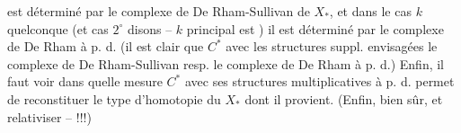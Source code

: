 est déterminé par le complexe de
De Rham-Sullivan de $X_*$, et dans
le cas $k$ quelconque (et cas $2^\circ$ disons
-- $k$ principal est ) il est
déterminé par le complexe de
De Rham à p. d. 
 (il est clair que $C^*$
avec les structures suppl. envisagées
 le complexe de De Rham-Sullivan resp. le complexe de
De Rham à p. d.) Enfin, il
faut voir dans quelle mesure $C^*$
avec ses structures multiplicatives
à p. d. permet de reconstituer le
type d'homotopie du $X_*$ dont
il provient. (Enfin, bien sûr,
 et relativiser -- !!!)
